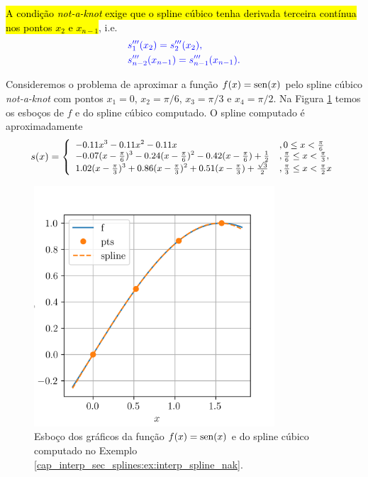 \hl{A condição \textit{not-a-knot} exige que o spline cúbico tenha derivada terceira contínua nos pontos $x_2$ e $x_{n-1}$}, i.e.
\begin{subequations}\hleq
  \begin{align}
    &s_1'''(x_2) = s_2'''(x_2),\\
    &s_{n-2}'''(x_{n-1}) = s_{n-1}'''(x_{n-1}).
  \end{align}
\end{subequations}

\begin{ex}\label{cap_interp_sec_splines:ex:interp_spline_nak}
  Consideremos o problema de aproximar a função $f(x)=\operatorname{sen}(x)$ pelo spline cúbico {\it not-a-knot} com pontos $x_1=0$, $x_2=\pi/6$, $x_3=\pi/3$ e $x_4=\pi/2$. Na Figura \ref{cap_interp_sec_splines:fig:interp_spline_nak} temos os esboços de $f$ e do spline cúbico computado. O spline computado é aproximadamente
  \begin{equation}
    s(x) = \small\left\{\begin{array}{ll}
                          -0.11x^3 - 0.11x^2 - 0.11x &, 0\leq x < \frac{\pi}{6}\\
                          -0.07(x-\frac{\pi}{6})^3 - 0.24(x-\frac{\pi}{6})^2 - 0.42(x-\frac{\pi}{6}) + \frac{1}{2} &, \frac{\pi}{6} \leq x < \frac{\pi}{3},\\
                          1.02(x-\frac{\pi}{3})^3 + 0.86(x-\frac{\pi}{3})^2 + 0.51(x-\frac{\pi}{3}) + \frac{\sqrt{3}}{2} &, \frac{\pi}{3} \leq x < \frac{\pi}{2}x
                                                                                                                     
    \end{array}\right.
  \end{equation}

  \begin{figure}[H]
    \centering
    \includegraphics[width=0.8\textwidth]{./cap_interp/dados/fig_CSNotAKnot/fig}
    \caption{Esboço dos gráficos da função $f(x)=\operatorname{sen}(x)$ e do spline cúbico computado no Exemplo \ref{cap_interp_sec_splines:ex:interp_spline_nak}.}
    \label{cap_interp_sec_splines:fig:interp_spline_nak}
  \end{figure}


\end{ex}
